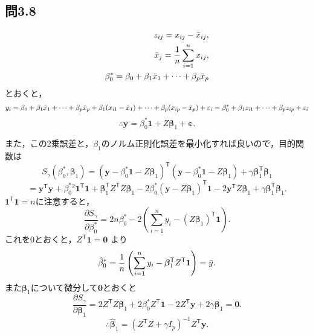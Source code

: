 \documentclass[pdflatex,ja=standard]{bxjsarticle}
\begin{document}
\subsection*{問3.8}
\begin{eqnarray}
z_{ij} = x_{ij} - \Bar{x}_{ij}, \\
\Bar{x}_j = \frac{1}{n} \sum_{i=1}^{n} x_{ij}, \\
\beta^{*}_0 = \beta_0 + \beta_1 \Bar{x}_1 + \cdots + \beta_p \Bar{x}_p 
\end{eqnarray}
とおくと，
\begin{equation}
y_i = \beta_0 + \beta_1 \Bar{x}_1 + \cdots + \beta_p \Bar{x}_p + \beta_1 (x_{i1} - \Bar{x}_1) + \cdots + \beta_p (x_{ip} - \Bar{x}_p) + \varepsilon_i \\
= \beta^{*}_0 + \beta_1 z_{i1} + \cdots + \beta_p z_{ip} + \varepsilon_i
\end{equation}
\begin{equation}
\therefore \bm{y} = \beta^{*}_0 \bm{1} + Z \bm{\beta}_{1} + \bm{\varepsilon}.
\end{equation}

また，この2乗誤差と，$\beta_1$のノルム正則化誤差を最小化すれば良いので，目的関数は
\begin{equation}
S_{\gamma} (\beta^{*}_0, \bm{\beta}_1) = (\bm{y} - \beta^{*}_0 \bm{1} - Z \bm{\beta}_{1})^{\mathsf{T}} (\bm{y} - \beta^{*}_0 \bm{1} - Z \bm{\beta}_{1}) + \gamma \bm{\beta}_1^{\mathsf{T}} \bm{\beta}_1
\end{equation}
\begin{equation}
= \bm{y}^{\mathsf{T}} \bm{y} + \beta^{*}_0^2 \bm{1}^{\mathsf{T}} \bm{1} + \bm{\beta}_1^{\mathsf{T}} Z^{\mathsf{T}} Z \bm{\beta}_1 - 2 \beta^{*}_0 (\bm{y} - Z \bm{\beta}_1)^{\mathsf{T}} \bm{1} -2 \bm{y}^{\mathsf{T}} Z \bm{\beta}_1 + \gamma \bm{\beta}_1^{\mathsf{T}} \bm{\beta}_1.
\end{equation}
$\bm{1}^{\mathsf{T}} \bm{1} = n$に注意すると，
\begin{equation}
\frac{\partial S_{\gamma}}{\partial \beta^{*}_0} = 2n\beta^{*}_0 - 2 \left( \sum_{i=1}^{n} y_i - (Z \bm{\beta}_1)^{\mathsf{T}} \bm{1} \right).
\end{equation}
これを0とおくと，$Z^{\mathsf{T}} \bm{1} = \bm{0}$ より
\begin{equation}
\hat{\beta}^{*}_0 = \frac{1}{n} \left( \sum_{i=1}^{n} y_i - \bm{\beta}_1^{\mathsf{T}} Z^{\mathsf{T}} \bm{1} \right) = \Bar{y}.
\end{equation}
また$\bm{\beta}_1$について微分して$\bm{0}$とおくと
\begin{equation}
\frac{\partial S_{\gamma}}{\partial \bm{\beta}_1} = 2 Z^{\mathsf{T}} Z \bm{\beta}_1 + 2 \beta^{*}_0 Z^{\mathsf{T}} \bm{1} - 2 Z^{\mathsf{T}} \bm{y} + 2 \gamma \bm{\beta}_1 = \bm{0}.
\end{equation}
\begin{equation}
\therefore \hat{\bm{\beta}}_1 = (Z^{\mathsf{T}} Z + \gamma I_p)^{-1} Z^{\mathsf{T}} \bm{y}.
\end{equation}
\end{document}
